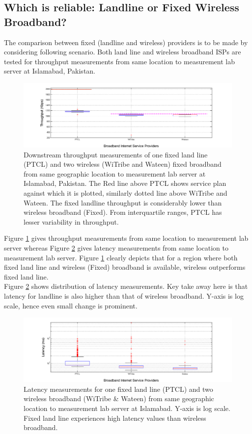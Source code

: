 \documentclass{sig-alternate-10pt}
\begin{document}
\subsection {Which is reliable: Landline or Fixed Wireless Broadband?}
The comparison between fixed (landline and wireless) providers is to be made by considering following scenario. Both land line and wireless broadband ISPs are tested for throughput measurements from same location to measurement lab server at Islamabad, Pakistan.
\begin{figure}[h!]
\begin {center}
   \includegraphics[height=0.2 \textheight,width=0.5 \textwidth]{8.png}
   \end {center}
 \caption{Downstream throughput measurements of one fixed land line (PTCL) and two wireless (WiTribe and Wateen) fixed broadband from same geographic location to measurement lab server at Islamabad, Pakistan. The Red line above PTCL shows service plan against which it is plotted, similarly dotted line above WiTribe and Wateen. The fixed landline throughput is considerably lower than wireless broadband (Fixed). From interquartile ranges, PTCL has lesser variability in throughput.} \label{Fig:8}
\end{figure}
Figure \ref{Fig:8} gives throughput measurements from same location to measurement lab server whereas Figure \ref{Fig:9} gives latency measurements from same location to measurement lab server. Figure \ref{Fig:8} clearly depicts that for a region where both fixed land line and wireless (Fixed) broadband is available, wireless outperforms fixed land line.\\
\indent Figure \ref{Fig:9} shows distribution of latency measurements. Key take away here is that latency for landline is also higher than that of wireless broadband. Y-axis is log scale, hence even small change is prominent.

\begin{figure}[h!]
\begin {center}
   \includegraphics[height=0.2 \textheight,width=0.5 \textwidth]{9.png}
   \end {center}
 \caption{Latency measurements for one fixed land line (PTCL) and two wireless broadband (WiTribe \& Wateen) from same geographic location to measurement lab server at Islamabad. Y-axis is log scale. Fixed land line experiences high latency values than wireless broadband.}\label{Fig:9}
\end{figure}
\end{document}
